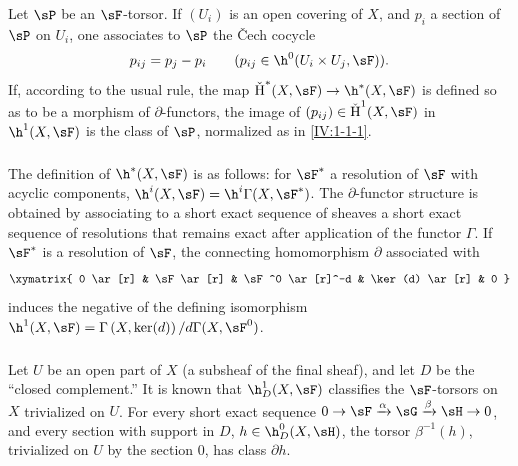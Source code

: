 \subsubsection{}\label{IV:1-1-2}

Let $\sP$ be an $\sF$-torsor. If $(U_i)$ is an open covering of $X$, and
$p_i$ a section of $\sP$ on $U_i$, one associates to $\sP$ the \v{C}ech
cocycle
\[
  p_{i j} = p_j - p_i \qquad \text{($p_{i j}\in \h^0(U_i\times U_j,\sF)$).}
\]
If, according to the usual rule, the map
$\operatorname{\check H}^*(X,\sF)\to \h^*(X,\sF)$ is defined so
as to be a morphism of $\partial$-functors, the image of
$(p_{i j})\in \operatorname{\check H}^1(X,\sF)$ in $\h^1(X,\sF)$ is the class
of $\sP$, normalized as in \ref{IV:1-1-1}.






\subsubsection{}\label{IV:1-1-3}

\marginpar{!}The definition of $\h^*(X,\sF)$ is as follows: for $\sF^*$ a
resolution of $\sF$ with acyclic components,
$\h^i(X,\sF) = \h^i\Gamma(X,\sF^*)$. The $\partial$-functor structure is
obtained by associating to a short exact sequence of sheaves a short exact
sequence of resolutions that remains exact after application of the functor
$\Gamma$. If $\sF^*$ is a resolution of $\sF$, the connecting
homomorphism $\partial$ associated with
\[\xymatrix{
  0 \ar[r]
    & \sF \ar[r]
    & \sF^0 \ar[r]^-d
    & \ker(d) \ar[r]
    & 0
}\]
induces the negative of the defining isomorphism
$\h^1(X,\sF) = \Gamma\left(X,\ker(d)\right)/d \Gamma(X,\sF^0)$.






\subsubsection{}\label{IV:1-1-4}

Let $U$ be an open part of $X$ (a subsheaf of the final sheaf), and let $D$
be the ``closed complement.'' It is known that $\h_D^1(X,\sF)$ classifies
the $\sF$-torsors on $X$ trivialized on $U$. For every short exact sequence
$0\to \sF\xrightarrow\alpha \sG\xrightarrow\beta\sH\to 0$, and every
section with support in $D$, $h\in\h_D^0(X,\sH)$, the torsor
$\beta^{-1}(h)$, trivialized on $U$ by the section $0$, has class
$\partial h$.


